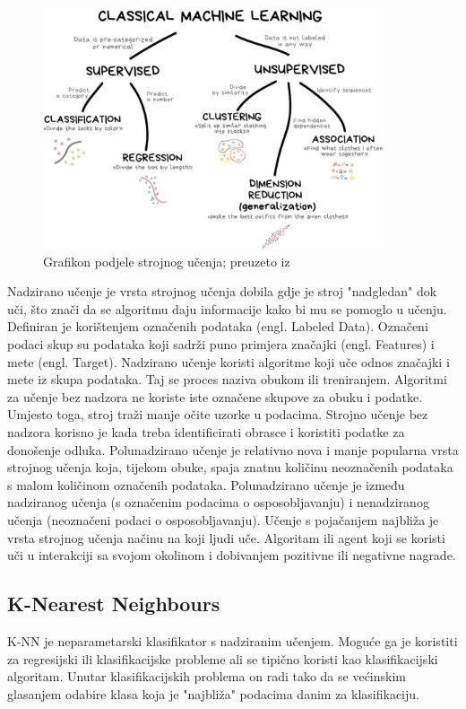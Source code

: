 \documentclass[]{foi}
\begin{document}
\begin{figure}[!h]
    \centering
    \includegraphics[width=0.9\textwidth]{slike/machine.jpg}
    \caption{Grafikon podjele strojnog učenja; preuzeto iz \cite{Machine}}
    \label{fig:machine-graf}
\end{figure}

Nadzirano učenje je vrsta strojnog učenja dobila gdje je stroj "nadgledan" dok uči, što znači da se algoritmu daju informacije kako bi mu se pomoglo u učenju. Definiran je korištenjem označenih podataka (engl. Labeled Data). Označeni podaci skup su podataka koji sadrži puno primjera značajki (engl. Features) i mete (engl. Target). Nadzirano učenje koristi algoritme koji uče odnos značajki i mete iz skupa podataka. Taj se proces naziva obukom ili treniranjem. \cite{Coursera2023}
Algoritmi za učenje bez nadzora ne koriste iste označene skupove za obuku i podatke. Umjesto toga, stroj traži manje očite uzorke u podacima. Strojno učenje bez nadzora korisno je kada treba identificirati obrasce i koristiti podatke za donošenje odluka. \cite{Coursera2023}
Polunadzirano učenje je relativno nova i manje popularna vrsta strojnog učenja koja, tijekom obuke, spaja znatnu količinu neoznačenih podataka s malom količinom označenih podataka. Polunadzirano učenje je između nadziranog učenja (s označenim podacima o osposobljavanju) i nenadziranog učenja (neoznačeni podaci o osposobljavanju). \cite{Datacamp}
Učenje s pojačanjem najbliža je vrsta strojnog učenja načinu na koji ljudi uče. Algoritam ili agent koji se koristi uči u interakciji sa svojom okolinom i dobivanjem pozitivne ili negativne nagrade. \cite{Coursera2023}

\subsection{K-Nearest Neighbours}
K-NN je neparametarski klasifikator s nadziranim učenjem. Moguće ga je koristiti za regresijski ili klasifikacijske probleme ali se tipično koristi kao klasifikacijski algoritam. Unutar klasifikacijskih problema on radi tako da se većinskim glasanjem odabire klasa koja je "najbliža" podacima danim za klasifikaciju. \cite{k-nearest}
\end{document}

